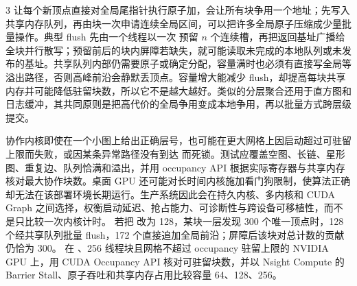 \begin{solutionexercise}{3}
让每个新顶点直接对全局尾指针执行原子加，会让所有块争用一个地址；先写入共享内存队列，再由块一次申请连续全局区间，可以把许多全局原子压缩成少量批量操作。典型 flush 先由一个线程以一次  预留 $n$ 个连续槽，再把返回基址广播给全块并行散写；预留前后的块内屏障若缺失，就可能读取未完成的本地队列或未发布的基址。共享队列内部仍需要原子或确定分配，容量满时也必须有直接写全局等溢出路径，否则高峰前沿会静默丢顶点。容量增大能减少 flush，却提高每块共享内存并可能降低驻留块数，所以它不是越大越好。类似的分层聚合还用于直方图和日志缓冲，其共同原则是把高代价的全局争用变成本地争用，再以批量方式跨层级提交。

协作内核即使在一个小图上给出正确层号，也可能在更大网格上因启动超过可驻留上限而失败，或因某条异常路径没有到达  而死锁。测试应覆盖空图、长链、星形图、重复边、队列恰满和溢出，并用 occupancy API 根据实际寄存器与共享内存核对最大协作块数。桌面 GPU 还可能对长时间内核施加看门狗限制，使算法正确却无法在该部署环境长期运行。生产系统因此会在持久内核、多内核和 CUDA Graph 之间选择，权衡启动延迟、抢占能力、可诊断性与跨设备可移植性，而不是只比较一次内核计时。
\variantheading 若把  改为 128，某块一层发现 300 个唯一顶点时，128 个经共享队列批量 flush，172 个直接追加全局前沿；屏障后该块对总计数的贡献仍恰为 300。
\practiceheading 在 、256 线程块且网格不超过 occupancy 驻留上限的 NVIDIA GPU 上，用 CUDA Occupancy API 核对可驻留块数，并以 Nsight Compute 的 Barrier Stall、原子吞吐和共享内存占用比较容量 64、128、256。
\end{solutionexercise}
